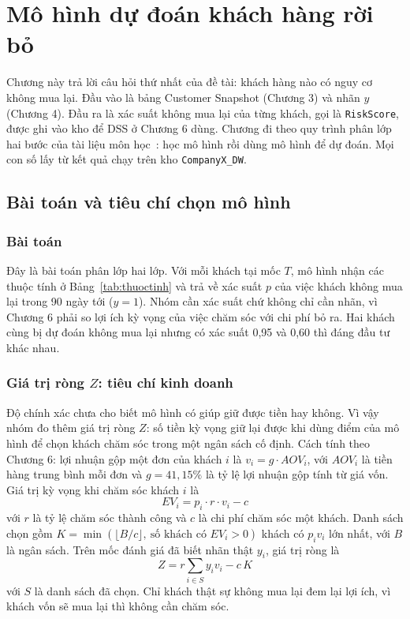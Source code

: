 \section{Mô hình dự đoán khách hàng rời bỏ}

Chương này trả lời câu hỏi thứ nhất của đề tài: khách hàng nào có nguy cơ không mua lại. Đầu vào là bảng Customer Snapshot (Chương 3) và nhãn $y$ (Chương 4). Đầu ra là xác suất không mua lại của từng khách, gọi là \texttt{RiskScore}, được ghi vào kho để DSS ở Chương 6 dùng. Chương đi theo quy trình phân lớp hai bước của tài liệu môn học~\cite{tlmh}: học mô hình rồi dùng mô hình để dự đoán. Mọi con số lấy từ kết quả chạy trên kho \texttt{CompanyX\_DW}.

\subsection{Bài toán và tiêu chí chọn mô hình}
\subsubsection{Bài toán}
Đây là bài toán phân lớp hai lớp. Với mỗi khách tại mốc $T$, mô hình nhận các thuộc tính ở Bảng~\ref{tab:thuoctinh} và trả về xác suất $p$ của việc khách không mua lại trong 90 ngày tới ($y=1$). Nhóm cần xác suất chứ không chỉ cần nhãn, vì Chương 6 phải so lợi ích kỳ vọng của việc chăm sóc với chi phí bỏ ra. Hai khách cùng bị dự đoán không mua lại nhưng có xác suất 0,95 và 0,60 thì đáng đầu tư khác nhau.

\subsubsection{Giá trị ròng $Z$: tiêu chí kinh doanh}
Độ chính xác chưa cho biết mô hình có giúp giữ được tiền hay không. Vì vậy nhóm đo thêm giá trị ròng $Z$: số tiền kỳ vọng giữ lại được khi dùng điểm của mô hình để chọn khách chăm sóc trong một ngân sách cố định. Cách tính theo Chương 6: lợi nhuận gộp một đơn của khách $i$ là $v_i = g \cdot AOV_i$, với $AOV_i$ là tiền hàng trung bình mỗi đơn và $g = 41{,}15\%$ là tỷ lệ lợi nhuận gộp tính từ giá vốn. Giá trị kỳ vọng khi chăm sóc khách $i$ là
\begin{equation}
    EV_i = p_i \cdot r \cdot v_i - c
\end{equation}
với $r$ là tỷ lệ chăm sóc thành công và $c$ là chi phí chăm sóc một khách. Danh sách chọn gồm $K = \min(\lfloor B/c \rfloor,\ \text{số khách có } EV_i > 0)$ khách có $p_i v_i$ lớn nhất, với $B$ là ngân sách. Trên mốc đánh giá đã biết nhãn thật $y_i$, giá trị ròng là
\begin{equation}
    Z = r \sum_{i \in S} y_i v_i - c\,K
\end{equation}
với $S$ là danh sách đã chọn. Chỉ khách thật sự không mua lại đem lại lợi ích, vì khách vốn sẽ mua lại thì không cần chăm sóc.

